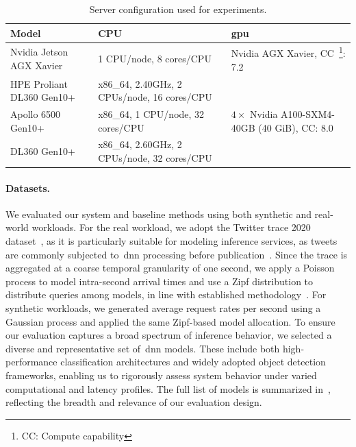 \begin{table}
	\centering
	\begin{tabular}{p{2cm}p{3cm}p{3cm}}
		\toprule
		\textbf{Model}            & \textbf{CPU}                                & \textbf{\acrshort{gpu}}                                                 \\
		\toprule

		Nvidia Jetson AGX Xavier  & 1 CPU/node, 8 cores/CPU                     & Nvidia AGX Xavier, CC~\footnote{CC: Compute capability}: 7.2 \\

		\midrule

		HPE Proliant DL360 Gen10+ & x86\_64, 2.40GHz, 2 CPUs/node, 16 cores/CPU &                                                              \\

		\midrule

		Apollo 6500 Gen10+        & x86\_64, 1 CPU/node, 32 cores/CPU           & $4\times$ Nvidia A100-SXM4-40GB (40 GiB), CC: 8.0            \\

		\midrule

		DL360 Gen10+              & x86\_64, 2.60GHz, 2 CPUs/node, 32 cores/CPU &                                                              \\

		\bottomrule
	\end{tabular}
	\caption{Server conﬁguration used for experiments.}
	\label{tab:serve_config}
\end{table}

\paragraph{Datasets.} We evaluated our system and baseline methods using both synthetic and real-world workloads. For the real workload, we adopt the Twitter trace 2020 dataset~\cite{twitterStreamTrace2020}, as it is particularly suitable for modeling inference services, as tweets are commonly subjected to~\acrfull{dnn} processing before publication~\cite{francisco2021infaas,ahmad2024proteus}. Since the trace is aggregated at a coarse temporal granularity of one second, we apply a Poisson process to model intra-second arrival times and use a Zipf distribution to distribute queries among models, in line with established methodology~\cite{francisco2021infaas,ahmad2024proteus}.
For synthetic workloads, we generated average request rates per second using a Gaussian process and applied the same Zipf-based model allocation. To ensure our evaluation captures a broad spectrum of inference behavior, we selected a diverse and representative set of~\acrshort{dnn} models. These include both high-performance classification architectures and widely adopted object detection frameworks, enabling us to rigorously assess system behavior under varied computational and latency profiles. The full list of models is summarized in~, reflecting the breadth and relevance of our evaluation design.

